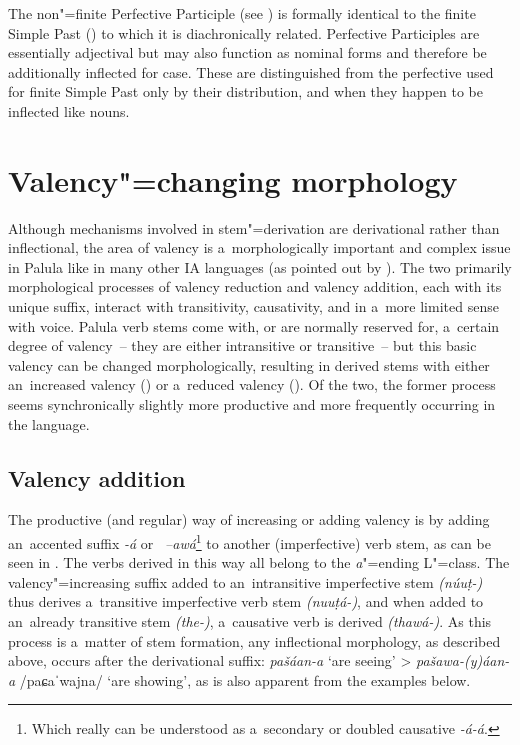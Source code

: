The non"=finite Perfective Participle (see ) is formally identical to the finite Simple Past () to which it is diachronically related. Perfective Participles are essentially adjectival but may also function as nominal forms and therefore be additionally inflected for case. These are distinguished from the perfective used for finite Simple Past only by their distribution, and when they happen to be inflected like nouns.


\section{Valency"=changing morphology}
\label{sec:8-5}

Although mechanisms involved in stem"=derivation are derivational rather than inflectional, the area of valency is a~morphologically important and complex issue in Palula like in many other IA languages (as pointed out by \citealt[315]{masica1991}). The two primarily morphological processes of valency reduction and valency addition, each with its unique suffix, interact with transitivity, causativity, and in a~more limited sense with voice. Palula verb stems come with, or are normally reserved for, a~certain degree of valency~-- they are either intransitive or transitive~-- but this basic valency can be changed morphologically, resulting in derived stems with either an~increased valency () or a~reduced valency (). Of the two, the former process seems synchronically slightly more productive and more frequently occurring in the language.


\subsection{Valency addition}
\label{subsec:8-5-1}

The productive (and regular) way of increasing or adding valency is by adding an~accented suffix
\textit{-á} or \textit{~--awá}\footnote{Which really can be understood as a~secondary or
  doubled causative \textit{-á-á}.} to another (imperfective) verb stem, as can be seen in
. The verbs derived in this way all belong to the \textit{a}"=ending L"=class. The valency"=increasing suffix added to an~intransitive imperfective stem \mbox{\textit{(núuṭ-)}} thus derives a~transitive imperfective verb stem \textit{(nuuṭá-)}, and when added to an~already transitive stem \textit{(the-)}, a~causative verb is derived \textit{(thawá-)}. As this process is a~matter of stem formation, any inflectional morphology, as described above, occurs after the derivational suffix: \textit{pašáan-a} `are seeing' {\textgreater} \textit{pašawa-(y)áan-a} /paɕaˈwajna/ `are showing', as is also apparent from the examples below.


